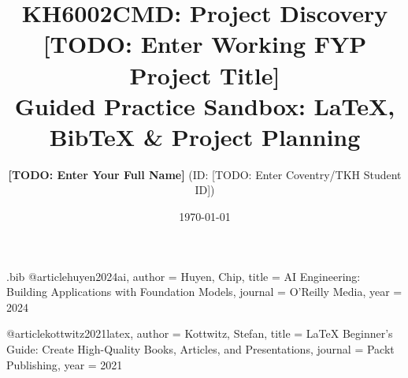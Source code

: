 \begin{filecontents*}{\jobname.bib}
@article{huyen2024ai,
  author  = {Huyen, Chip},
  title   = {AI Engineering: Building Applications with Foundation Models},
  journal = {O'Reilly Media},
  year    = {2024}
}

@article{kottwitz2021latex,
  author  = {Kottwitz, Stefan},
  title   = {LaTeX Beginner's Guide: Create High-Quality Books, Articles, and Presentations},
  journal = {Packt Publishing},
  year    = {2021}
}
\end{filecontents*}

\documentclass[12pt,a4paper]{article}

\usepackage[utf8]{inputenc}
\usepackage[T1]{fontenc}
\usepackage[margin=2.54cm]{geometry}
\usepackage{booktabs,tabularx}
\usepackage{pgfgantt}
\usepackage[dvipsnames,table]{xcolor}
\usepackage[hidelinks]{hyperref}

\newcommand{\studentname}{[TODO: Enter Your Full Name]}
\newcommand{\studentid}{[TODO: Enter Coventry/TKH Student ID]}
\newcommand{\projecttitle}{[TODO: Enter Working FYP Project Title]}
\newcommand{\modulecode}{KH6002CMD}
\newcommand{\moduletitle}{Project Discovery}

\title{\vspace{-1.5cm}\textbf{\large \modulecode: \moduletitle}\\[0.3cm]
\Large \textbf{\projecttitle}\\[0.2cm]
\normalsize Guided Practice Sandbox: LaTeX, BibTeX \& Project Planning}
\author{\textbf{\studentname} \quad (ID: \studentid)}
\date{\today}


\maketitle
\thispagestyle{empty}

\noindent\rule{\textwidth}{0.8pt}
\vspace{-0.3cm}

